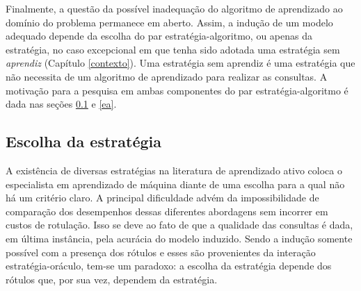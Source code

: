 Finalmente, a questão da possível inadequação do algoritmo de aprendizado ao domínio do problema permanece em aberto.
Assim, a indução de um modelo adequado depende da escolha do par estratégia-algoritmo, ou apenas da estratégia, no caso excepcional em que tenha sido adotada uma estratégia sem \textit{aprendiz} (Capítulo \ref{contexto}).
Uma estratégia sem aprendiz é uma estratégia que não necessita de um algoritmo de aprendizado para realizar as consultas.
A motivação para a pesquisa em ambas componentes do par estratégia-algoritmo é dada nas seções \ref{ee} e \ref{ea}.

\subsection{Escolha da estratégia}\label{ee}
A existência de diversas estratégias na literatura de aprendizado ativo coloca o especialista em aprendizado de máquina diante de uma escolha para a qual não há um critério claro.
A principal dificuldade advém da impossibilidade de comparação dos desempenhos dessas diferentes abordagens 
sem incorrer em custos de rotulação.
Isso se deve ao fato de que a qualidade das consultas é dada, em última instância, pela acurácia do modelo induzido.
Sendo a indução somente possível com a presença dos rótulos e esses são provenientes da interação estratégia-oráculo, tem-se um paradoxo:
a escolha da estratégia depende dos rótulos que, por sua vez, dependem da estratégia.

